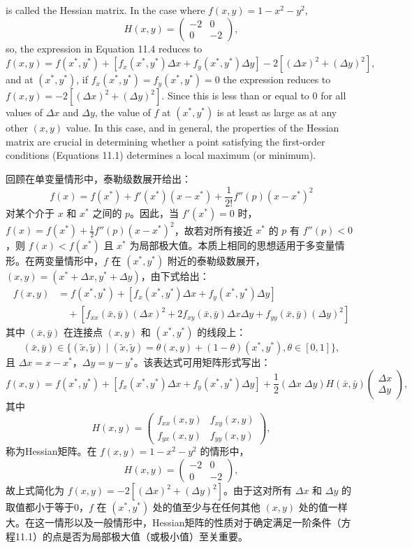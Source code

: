 \begin{original}
\[\]
is called the Hessian matrix. In the case where $f(x, y) = 1 - x^2 - y^2$,
\[
H(x, y) = \begin{pmatrix} -2 & 0 \\ 0 & -2 \end{pmatrix},
\]
so, the expression in Equation 11.4 reduces to
\[
f(x, y) = f(x^*, y^*) + [f_x(x^*, y^*)\Delta x + f_y(x^*, y^*)\Delta y] - 2[(\Delta x)^2 + (\Delta y)^2],
\]
and at $(x^*, y^*)$, if $f_x(x^*, y^*) = f_y(x^*, y^*) = 0$ the expression reduces to $f(x, y) = -2[(\Delta x)^2 + (\Delta y)^2]$. Since this is less than or equal to 0 for all values of $\Delta x$ and $\Delta y$, the value of $f$ at $(x^*, y^*)$ is at least as large as at any other $(x, y)$ value. In this case, and in general, the properties of the Hessian matrix are crucial in determining whether a point satisfying the first-order conditions (Equations 11.1) determines a local maximum (or minimum).
\end{original}
\begin{translation}
回顾在单变量情形中，泰勒级数展开给出：
\[
f(x) = f(x^*) + f'(x^*)(x - x^*) + \frac{1}{2!}f''(p)(x - x^*)^2
\]
对某个介于 $x$ 和 $x^*$ 之间的 $p$。因此，当 $f'(x^*) = 0$ 时，$f(x) = f(x^*) + \frac{1}{2}f''(p)(x-x^*)^2$，故若对所有接近 $x^*$ 的 $p$ 有 $f''(p) < 0$，则 $f(x) < f(x^*)$ 且 $x^*$ 为局部极大值。本质上相同的思想适用于多变量情形。在两变量情形中，$f$ 在 $(x^*, y^*)$ 附近的泰勒级数展开，$(x, y) = (x^* + \Delta x, y^* + \Delta y)$，由下式给出：
\begin{align}
f(x, y) &= f(x^*, y^*) + [f_x(x^*, y^*)\Delta x + f_y(x^*, y^*)\Delta y] \tag{11.2}\\
&\quad + [f_{xx}(\bar{x}, \bar{y})(\Delta x)^2 + 2f_{xy}(\bar{x}, \bar{y})\Delta x\Delta y + f_{yy}(\bar{x}, \bar{y})(\Delta y)^2] \tag{11.3}
\end{align}
其中 $(\bar{x}, \bar{y})$ 在连接点 $(x, y)$ 和 $(x^*, y^*)$ 的线段上：
\[
(\bar{x}, \bar{y}) \in \{(\tilde{x}, \tilde{y}) \mid (\tilde{x}, \tilde{y}) = \theta(x, y) + (1-\theta)(x^*, y^*), \theta \in [0,1]\},
\]
且 $\Delta x = x - x^*$，$\Delta y = y - y^*$。该表达式可用矩阵形式写出：
\[
f(x, y) = f(x^*, y^*) + [f_x(x^*, y^*)\Delta x + f_y(x^*, y^*)\Delta y] + \frac{1}{2}(\Delta x\; \Delta y) H(\bar{x}, \bar{y}) \begin{pmatrix} \Delta x \\ \Delta y \end{pmatrix},
\]
其中
\[
H(x, y) = \begin{pmatrix} f_{xx}(x, y) & f_{xy}(x, y) \\ f_{yx}(x, y) & f_{yy}(x, y) \end{pmatrix},
\]
称为Hessian矩阵。在 $f(x, y) = 1 - x^2 - y^2$ 的情形中，
\[
H(x, y) = \begin{pmatrix} -2 & 0 \\ 0 & -2 \end{pmatrix},
\]
故上式简化为 $f(x, y) = -2[(\Delta x)^2 + (\Delta y)^2]$。由于这对所有 $\Delta x$ 和 $\Delta y$ 的取值都小于等于0，$f$ 在 $(x^*, y^*)$ 处的值至少与在任何其他 $(x, y)$ 处的值一样大。在这一情形以及一般情形中，Hessian矩阵的性质对于确定满足一阶条件（方程11.1）的点是否为局部极大值（或极小值）至关重要。
\end{translation}

